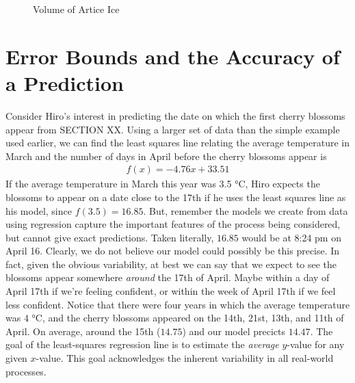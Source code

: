 \documentclass[10pt,]{book}
\theoremstyle{ptxdefinitionnotitle}
\theoremstyle{ptxdefinitiontitle}
\numberwithin{equation}{section}
\begin{document}
\begin{divisionexercise}{3}
\begin{figure}
{
}
\caption{Volume of Artice Ice\label{figure-46}}
\end{figure}
\end{divisionexercise}%
\typeout{************************************************}
\typeout{************************************************}
\section[{Error Bounds and the Accuracy of a Prediction}]{Error Bounds and the Accuracy of a Prediction}\label{chapter01-section10}
\hypertarget{p-127}{}%
Consider Hiro's interest in predicting the date on which the first cherry blossoms appear from SECTION XX. Using a larger set of data than the simple example used earlier, we can find the least squares line relating the average temperature in March and the number of days in April before the cherry blossoms appear is%
\begin{gather*}
f(x) = -4.76x + 33.51
\end{gather*}
If the average temperature in March this year was 3.5 \si{\degreeCelsius}, Hiro expects the blossoms to appear on a date close to the 17th if he uses the least squares line as his model, since \(f(3.5) = 16.85\). But, remember the models we create from data using regression capture the important features of the process being considered, but cannot give exact predictions. Taken literally, \(16.85\) would be at 8:24 pm on April 16. Clearly, we do not believe our model could possibly be this precise. In fact, given the obvious variability, at best we can say that we expect to see the blossoms appear somewhere \emph{around} the 17th of April. Maybe within a day of April 17th if we're feeling confident, or within the week of April 17th if we feel less confident. Notice that there were four years in which the average temperature was \(4\) \si{\degreeCelsius}, and the cherry blossoms appeared on the 14th, 21st, 13th, and 11th of April.  On average, around the 15th (\(14.75\)) and our model precicts \(14.47\). The goal of the least-squares regression line is to estimate the \emph{average} \(y\)-value for any given \(x\)-value. This goal acknowledges the inherent variability in all real-world processes.%
\end{document}
